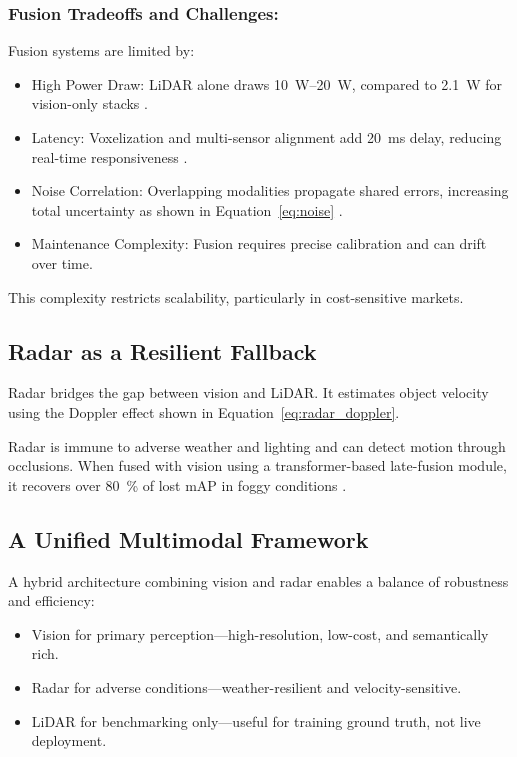 \documentclass[12pt]{article}
\begin{document}
\subsubsection{Fusion Tradeoffs and Challenges:}

Fusion systems are limited by:

\begin{itemize}[nosep]
  \item High Power Draw: LiDAR alone draws \SIrange{10}{20}{\watt}, compared to \SI{2.1}{\watt} for vision-only stacks \autocite{Chen2024EndToEndAD}.
  \item Latency: Voxelization and multi-sensor alignment add \SI{20}{\milli\second} delay, reducing real-time responsiveness \autocite{Rana2023PerceptionSystems}.
  \item Noise Correlation: Overlapping modalities propagate shared errors, increasing total uncertainty as shown in Equation~\ref{eq:noise} \autocite{Rana2023PerceptionSystems}.
  \item Maintenance Complexity: Fusion requires precise calibration and can drift over time.
\end{itemize}

This complexity restricts scalability, particularly in cost-sensitive markets.

\subsection{Radar as a Resilient Fallback}

Radar bridges the gap between vision and LiDAR. It estimates object velocity
using the Doppler effect shown in Equation~\ref{eq:radar_doppler}.

Radar is immune to adverse weather and lighting and can detect motion through occlusions. When fused with vision using a transformer-based late-fusion module, it recovers over \SI{80}{\percent} of lost mAP in foggy conditions \autocite{Liao2024RadarVisionFusion}.

\subsection{A Unified Multimodal Framework}

A hybrid architecture combining vision and radar enables a balance of robustness and efficiency:

\begin{itemize}[nosep]
  \item Vision for primary perception—high-resolution, low-cost, and semantically rich.
  \item Radar for adverse conditions—weather-resilient and velocity-sensitive.
  \item LiDAR for benchmarking only—useful for training ground truth, not live deployment.
\end{itemize}
\end{document}

